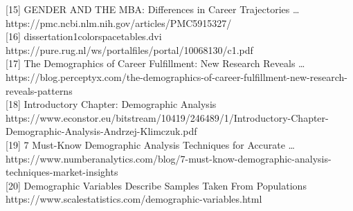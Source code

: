 \documentclass[./main.tex]{subfiles}
\begin{document}
{[}15{]} GENDER AND THE MBA: Differences in Career Trajectories \ldots{}
https://pmc.ncbi.nlm.nih.gov/articles/PMC5915327/\\
{[}16{]} dissertation1colorspacetables.dvi
https://pure.rug.nl/ws/portalfiles/portal/10068130/c1.pdf\\
{[}17{]} The Demographics of Career Fulfillment: New Research Reveals
\ldots{}
https://blog.perceptyx.com/the-demographics-of-career-fulfillment-new-research-reveals-patterns\\
{[}18{]} Introductory Chapter: Demographic Analysis
https://www.econstor.eu/bitstream/10419/246489/1/Introductory-Chapter-Demographic-Analysis-Andrzej-Klimczuk.pdf\\
{[}19{]} 7 Must-Know Demographic Analysis Techniques for Accurate
\ldots{}
https://www.numberanalytics.com/blog/7-must-know-demographic-analysis-techniques-market-insights\\
{[}20{]} Demographic Variables Describe Samples Taken From Populations
https://www.scalestatistics.com/demographic-variables.html\\
\end{document}
